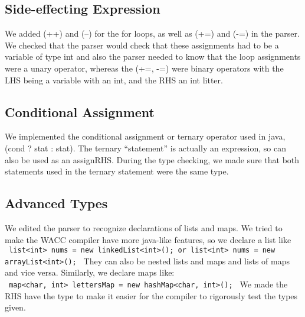 \documentclass[a4paper]{article}
\theoremstyle{definition}
\begin{document}
\subsection{Side-effecting Expression}
We added (++) and (--) for the for loops, as well as (+=) and (-=) in the parser. We checked that the parser would check that these assignments had to be a variable of type int and also the parser needed to know that the loop assignments were a unary operator, whereas the (+=, -=) were binary operators with the LHS being a variable with an int, and the RHS an int litter.

\subsection{Conditional Assignment}
We implemented the conditional assignment or ternary operator used in java, (cond ? stat : stat). The ternary “statement” is actually an expression, so can also be used as an assignRHS. During the type checking, we made sure that both statements used in the ternary statement were the same type.

\subsection{Advanced Types}
We edited the parser to recognize declarations of lists and maps. We tried to make the WACC compiler have more java-like features, so we declare a list like
\\
\texttt{\noindent
\phantom{3ex}list<int> nums = new linkedList<int>(); or list<int> nums = new arrayList<int>();
\newline\noindent
}
They can also be nested lists and maps and lists of maps and vice versa. Similarly, we declare maps like:
\\
\texttt{\noindent
\phantom{3ex}map<char, int> lettersMap = new hashMap<char, int>();
\newline\noindent
}
We made the RHS have the type to make it easier for the compiler to rigorously test the types given.
\end{document}
